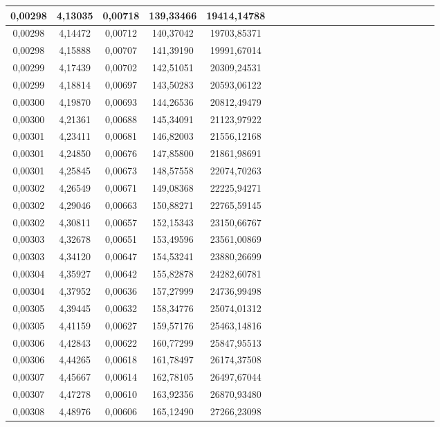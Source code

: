 \documentclass[10pt,a4paper]{article}
\begin{document}
\begin{center}
\begin{center}
\begin{table}[h!]
\begin{tabular}{|c|c|c|c|c|c|c|c|c|c|c|c|c|c|c|c|c|c|c|c|c|c|}
0,00298  & 4,13035   & 0,00718 & 139,33466 & 19414,14788              \\ \hline
0,00298  & 4,14472   & 0,00712 & 140,37042 & 19703,85371              \\ \hline
0,00298  & 4,15888   & 0,00707 & 141,39190 & 19991,67014              \\ \hline
0,00299  & 4,17439   & 0,00702 & 142,51051 & 20309,24531              \\ \hline
0,00299  & 4,18814   & 0,00697 & 143,50283 & 20593,06122              \\ \hline
0,00300  & 4,19870   & 0,00693 & 144,26536 & 20812,49479              \\ \hline
0,00300  & 4,21361   & 0,00688 & 145,34091 & 21123,97922              \\ \hline
0,00301  & 4,23411   & 0,00681 & 146,82003 & 21556,12168              \\ \hline
0,00301  & 4,24850   & 0,00676 & 147,85800 & 21861,98691              \\ \hline
0,00301  & 4,25845   & 0,00673 & 148,57558 & 22074,70263              \\ \hline
0,00302  & 4,26549   & 0,00671 & 149,08368 & 22225,94271              \\ \hline
0,00302  & 4,29046   & 0,00663 & 150,88271 & 22765,59145              \\ \hline
0,00302  & 4,30811   & 0,00657 & 152,15343 & 23150,66767              \\ \hline
 0,00303  & 4,32678   & 0,00651 & 153,49596 & 23561,00869              \\ \hline
0,00303  & 4,34120   & 0,00647 & 154,53241 & 23880,26699              \\ \hline
0,00304  & 4,35927   & 0,00642 & 155,82878 & 24282,60781              \\ \hline
0,00304  & 4,37952   & 0,00636 & 157,27999 & 24736,99498              \\ \hline
0,00305  & 4,39445   & 0,00632 & 158,34776 & 25074,01312              \\ \hline
0,00305  & 4,41159   & 0,00627 & 159,57176 & 25463,14816              \\ \hline
0,00306  & 4,42843   & 0,00622 & 160,77299 & 25847,95513              \\ \hline
0,00306  & 4,44265   & 0,00618 & 161,78497 & 26174,37508              \\ \hline
0,00307  & 4,45667   & 0,00614 & 162,78105 & 26497,67044              \\ \hline
0,00307  & 4,47278   & 0,00610 & 163,92356 & 26870,93480              \\ \hline
0,00308  & 4,48976   & 0,00606 & 165,12490 & 27266,23098              \\ \hline
\end{tabular}
 \end{table}
 \end{center}
 

\end{center}
\end{document}
